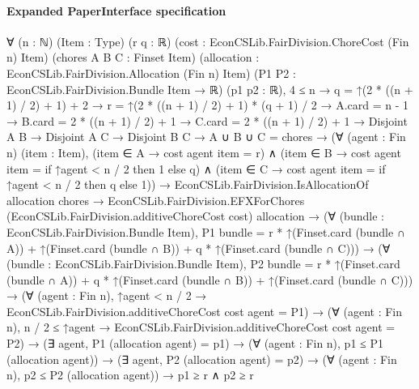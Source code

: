 \documentclass[10pt]{article}
\begin{document}
\paragraph{Expanded PaperInterface specification}
\begin{ReviewVerbatim}
∀ (n : ℕ) (Item : Type) (r q : ℝ) (cost : EconCSLib.FairDivision.ChoreCost (Fin n) Item) (chores A B C : Finset Item)
  (allocation : EconCSLib.FairDivision.Allocation (Fin n) Item) (P1 P2 : EconCSLib.FairDivision.Bundle Item → ℝ)
  (p1 p2 : ℝ),
  4 ≤ n →
    q = ↑(2 * ((n + 1) / 2) + 1) + 2 →
      r = ↑(2 * ((n + 1) / 2) + 1) * (q + 1) / 2 →
        A.card = n - 1 →
          B.card = 2 * ((n + 1) / 2) + 1 →
            C.card = 2 * ((n + 1) / 2) + 1 →
              Disjoint A B →
                Disjoint A C →
                  Disjoint B C →
                    A ∪ B ∪ C = chores →
                      (∀ (agent : Fin n) (item : Item),
                          (item ∈ A → cost agent item = r) ∧
                            (item ∈ B → cost agent item = if ↑agent < n / 2 then 1 else q) ∧
                              (item ∈ C → cost agent item = if ↑agent < n / 2 then q else 1)) →
                        EconCSLib.FairDivision.IsAllocationOf allocation chores →
                          EconCSLib.FairDivision.EFXForChores (EconCSLib.FairDivision.additiveChoreCost cost)
                              allocation →
                            (∀ (bundle : EconCSLib.FairDivision.Bundle Item),
                                P1 bundle =
                                  r * ↑(Finset.card (bundle ∩ A)) + ↑(Finset.card (bundle ∩ B)) +
                                    q * ↑(Finset.card (bundle ∩ C))) →
                              (∀ (bundle : EconCSLib.FairDivision.Bundle Item),
                                  P2 bundle =
                                    r * ↑(Finset.card (bundle ∩ A)) + q * ↑(Finset.card (bundle ∩ B)) +
                                      ↑(Finset.card (bundle ∩ C))) →
                                (∀ (agent : Fin n),
                                    ↑agent < n / 2 → EconCSLib.FairDivision.additiveChoreCost cost agent = P1) →
                                  (∀ (agent : Fin n),
                                      n / 2 ≤ ↑agent → EconCSLib.FairDivision.additiveChoreCost cost agent = P2) →
                                    (∃ agent, P1 (allocation agent) = p1) →
                                      (∀ (agent : Fin n), p1 ≤ P1 (allocation agent)) →
                                        (∃ agent, P2 (allocation agent) = p2) →
                                          (∀ (agent : Fin n), p2 ≤ P2 (allocation agent)) → p1 ≥ r ∧ p2 ≥ r
\end{ReviewVerbatim}
\end{document}
